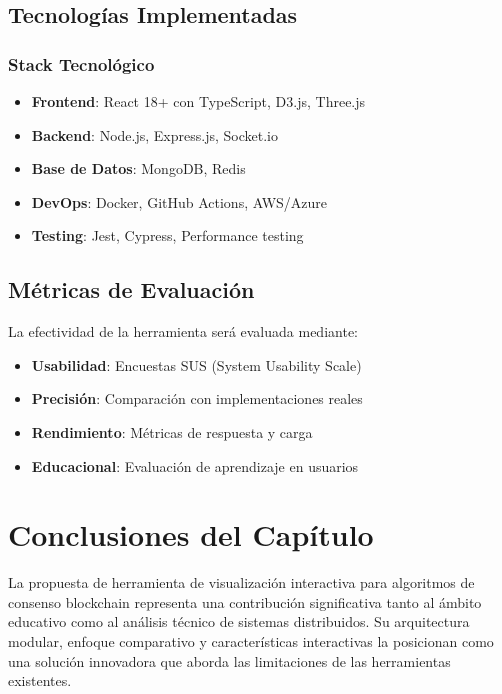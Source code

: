 \documentclass[spanish,12pt,letterpaper]{report}
\begin{document}
\subsection{Tecnologías Implementadas}

\subsubsection{Stack Tecnológico}

\begin{itemize}
    \item \textbf{Frontend}: React 18+ con TypeScript, D3.js, Three.js
    \item \textbf{Backend}: Node.js, Express.js, Socket.io
    \item \textbf{Base de Datos}: MongoDB, Redis
    \item \textbf{DevOps}: Docker, GitHub Actions, AWS/Azure
    \item \textbf{Testing}: Jest, Cypress, Performance testing
\end{itemize}

\subsection{Métricas de Evaluación}

La efectividad de la herramienta será evaluada mediante:

\begin{itemize}
    \item \textbf{Usabilidad}: Encuestas SUS (System Usability Scale)
    \item \textbf{Precisión}: Comparación con implementaciones reales
    \item \textbf{Rendimiento}: Métricas de respuesta y carga
    \item \textbf{Educacional}: Evaluación de aprendizaje en usuarios
\end{itemize}

\section{Conclusiones del Capítulo}

La propuesta de herramienta de visualización interactiva para algoritmos de consenso blockchain representa una contribución significativa tanto al ámbito educativo como al análisis técnico de sistemas distribuidos. Su arquitectura modular, enfoque comparativo y características interactivas la posicionan como una solución innovadora que aborda las limitaciones de las herramientas existentes.
\end{document}
